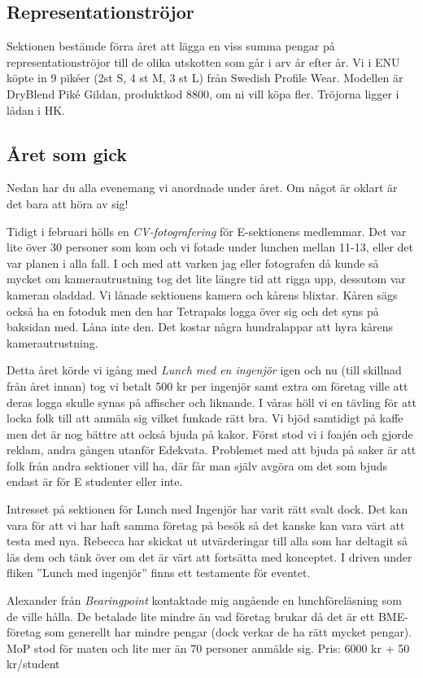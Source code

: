 \documentclass[10pt]{article}
\begin{document}
\subsection*{Representationströjor}
Sektionen bestämde förra året att lägga en viss summa pengar på representationströjor till de olika utskotten som går i arv år efter år. Vi i ENU köpte in 9 pikéer (2st S, 4 st M, 3 st L) från Swedish Profile Wear. Modellen är DryBlend Piké Gildan, produktkod 8800, om ni vill köpa fler. Tröjorna ligger i lådan i HK.

\subsection*{Året som gick}
Nedan har du alla evenemang vi anordnade under året. Om något är oklart är det bara att höra av sig!

Tidigt i februari hölls en \textit{CV-fotografering} för E-sektionens medlemmar. Det var lite över 30 personer som kom och vi fotade under lunchen mellan 11-13, eller det var planen i alla fall. I och med att varken jag eller fotografen då kunde så mycket om kamerautrustning tog det lite längre tid att rigga upp, dessutom var kameran oladdad. Vi lånade sektionens kamera och kårens blixtar. Kåren sägs också ha en fotoduk men den har Tetrapaks logga över sig och det syns på baksidan med. Låna inte den. Det kostar några hundralappar att hyra kårens kamerautrustning.


Detta året körde vi igång med \textit{Lunch med en ingenjör} igen och nu (till skillnad från året innan) tog vi betalt 500 kr per ingenjör samt extra om företag ville att deras logga skulle synas på affischer och liknande. I våras höll vi en tävling för att locka folk till att anmäla sig vilket funkade rätt bra. Vi bjöd samtidigt på kaffe men det är nog bättre att också bjuda på kakor. Först stod vi i foajén och gjorde reklam, andra gången utanför Edekvata. Problemet med att bjuda på saker är att folk från andra sektioner vill ha, där får man själv avgöra om det som bjuds endast är för E studenter eller inte.

Intresset på sektionen för Lunch med Ingenjör har varit rätt svalt dock. Det kan vara för att vi har haft samma företag på besök så det kanske kan vara värt att testa med nya. Rebecca har skickat ut utvärderingar till alla som har deltagit så läs dem och tänk över om det är värt att fortsätta med konceptet. I driven under fliken ''Lunch med ingenjör'' finns ett testamente för eventet.

Alexander från \textit{Bearingpoint} kontaktade mig angående en lunchföreläsning som de ville hålla. De betalade lite mindre än vad företag brukar då det är ett BME-företag som generellt har mindre pengar (dock verkar de ha rätt mycket pengar). MoP stod för maten och lite mer än 70 personer anmälde sig. Pris: 6000 kr + 50 kr/student
\end{document}
